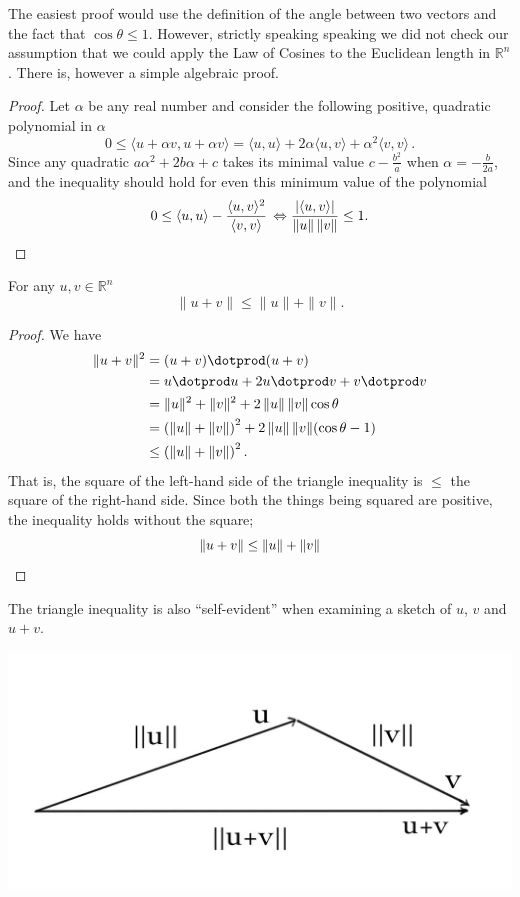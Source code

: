 The easiest proof would use the definition of the angle between two vectors and the fact that $\cos \theta \leq 1$. However, strictly speaking speaking we did not check our assumption that we could apply the Law of Cosines
to the Euclidean length in ${\mathbb R}^n$. There is, however a simple algebraic proof. 
\begin{proof}
Let $\alpha$ be any
real number and consider the following positive, quadratic polynomial in $\alpha$
\[
0\leq \langle u+\alpha v,u+\alpha v\rangle = \langle u,u\rangle +2\alpha \langle u,v\rangle +\alpha^2 \langle v,v\rangle\, .
\]
Since any quadratic $a\alpha^2 + 2b \alpha + c$ takes its minimal value
$c-\frac{b^2}{a}$
when $\alpha=-\frac{b}{2a}$,  and the inequality should hold for even this minimum value of the polynomial 
\[
0\leq \langle u,u\rangle -\frac{\langle u,v\rangle^2}{\langle v,v\rangle}\, 
\Leftrightarrow 
\frac{|\langle u,v \rangle|}{\|u\|\, \|v\|} \leq 1.\qedhere
\]
\end{proof}

\begin{theorem}
For any $u,v\in \mathbb{R}^n$
\[ \|u+v\| \leq \|u\| + \|v\| .\]
\end{theorem}

\begin{proof}
We have
\begin{align*}
\|u+v\|^2 & = (u+v)\dotprod (u+v) \\
 	& = u\dotprod u + 2 u\dotprod v + v\dotprod v \\
	& = \|u\|^2 + \|v\|^2 + 2\,  \|u\|\,  \|v\| \cos \theta \\
	& = \left(\|u\| + \|v\|\right)^2 + 2 \, \|u\| \, \|v\| (\cos \theta -1) \\
	& \leq \left(\|u\| + \|v\|\right)^2	.
\end{align*}
That is, the square of the left-hand side of the triangle inequality is $\leq$ the square of the right-hand side. Since both the things being squared are positive, the inequality holds without the square;
\[ \|u+v\| \leq  \|u\| + \|v\|   \qedhere\]
\end{proof}

The triangle inequality is also ``self-evident'' when examining a sketch of $u$, $v$ and $u+v$.
\begin{center}
\includegraphics[scale=.25]{triangleagain.jpg}
\end{center}


